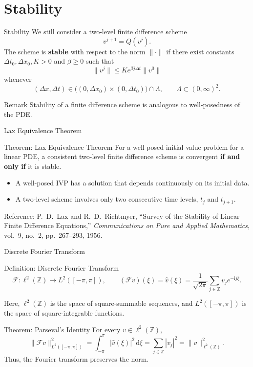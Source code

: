 \documentclass{beamer}
\newcommand{\dd}{\mathrm{d}}
\newcommand{\ii}{\mathrm{i}}
\begin{document}
\section{Stability}
\begin{frame}{Stability}
We still consider a two-level finite difference scheme
\[
v^{j+1}=Q(v^j).
\]
The scheme is \textbf{stable} with respect to the norm $\|\cdot\|$ if there
exist constants $\Delta t_0,\Delta x_0,K>0$ and $\beta\ge 0$ such that
\[
\|v^j\|\le K e^{\beta j\Delta t}\|v^0\|
\]
whenever
\[
(\Delta x,\Delta t)\in
\bigl((0,\Delta x_0)\times(0,\Delta t_0)\bigr)\cap\Lambda,
\qquad \Lambda\subset(0,\infty)^2.
\]
\begin{block}{Remark}
Stability of a finite difference scheme is analogous to well-posedness
of the PDE.
\end{block}

\end{frame}

\begin{frame}{Lax Equivalence Theorem}
\begin{block}{Theorem: Lax Equivalence Theorem}
For a well-posed initial-value problem for a linear PDE, a consistent
two-level finite difference scheme is convergent \textbf{if and only if} it is
stable.
\end{block}

\begin{itemize}
    \item A well-posed IVP has a solution that depends continuously on its
    initial data.
    \item A two-level scheme involves only two consecutive time levels,
    $t_j$ and $t_{j+1}$.
\end{itemize}

\vfill
{\footnotesize
Reference: P.~D.~Lax and R.~D.~Richtmyer,
``Survey of the Stability of Linear Finite Difference Equations,''
\textit{Communications on Pure and Applied Mathematics},
vol.~9, no.~2, pp.~267--293, 1956.
}

\end{frame}






\begin{frame}{Discrete Fourier Transform}

\begin{block}{Definition: Discrete Fourier Transform}
\[
\mathcal{F}:\ell^2(\mathbb{Z})\longrightarrow L^2([-\pi,\pi]),
\qquad
(\mathcal{F}v)(\xi)=\widehat v(\xi)
=\frac{1}{\sqrt{2\pi}}\sum_{j\in\mathbb Z}v_j e^{-\ii j\xi}.
\]
\end{block}
Here, $\ell^2(\mathbb{Z})$ is the space of square-summable sequences,
and $L^2([-\pi,\pi])$ is the space of square-integrable functions.
\begin{block}{Theorem: Parseval's Identity}
For every $v\in\ell^2(\mathbb{Z})$,
\[
\|\mathcal{F}v\|_{L^2([-\pi,\pi])}^2
=
\int_{-\pi}^{\pi}|\widehat v(\xi)|^2\,\dd\xi
=
\sum_{j\in\mathbb Z}|v_j|^2
=
\|v\|_{\ell^2(\mathbb{Z})}^2.
\]
Thus, the Fourier transform preserves the norm.
\end{block}
\end{frame}
\end{document}
